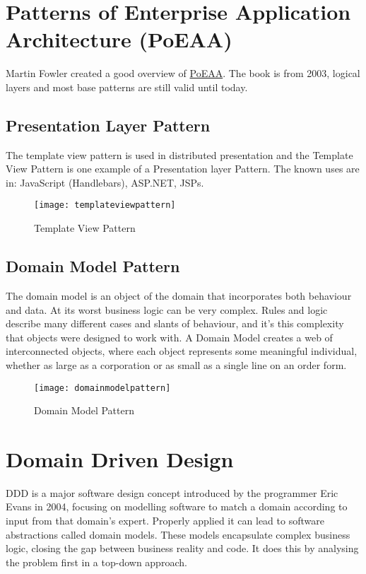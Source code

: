 \section{Patterns of Enterprise Application Architecture (PoEAA)}
Martin Fowler created a good overview of \href{https://www.martinfowler.com/eaaCatalog/index.html}{PoEAA}. The book is from 2003, logical layers and most base patterns are still valid until today.

\subsection{Presentation Layer Pattern}
The template view pattern is used in distributed presentation and the Template View Pattern is one example of a Presentation layer Pattern. The known uses are in: JavaScript (Handlebars), ASP.NET, JSPs.

\begin{figure}[H]
  \center
  \texttt{[image: templateviewpattern]}
  \caption{Template View Pattern}
\end{figure}

\subsection{Domain Model Pattern}
The domain model is an object of the domain that incorporates both behaviour and data. At its worst business logic can be very complex. Rules and logic describe many different cases and slants of behaviour, and it's this complexity that objects were designed to work with. A Domain Model creates a web of interconnected objects, where each object represents some meaningful individual, whether as large as a corporation or as small as a single line on an order form.

\begin{figure}[H]
  \center
  \texttt{[image: domainmodelpattern]}
  \caption{Domain Model Pattern}
\end{figure}

\section{Domain Driven Design}
DDD is a major software design concept introduced by the programmer Eric Evans in 2004, focusing on modelling software to match a domain according to input from that domain's expert. Properly applied it can lead to software abstractions called domain models. These models encapsulate complex business logic, closing the gap between business reality and code. It does this by analysing the problem first in a top-down approach.

